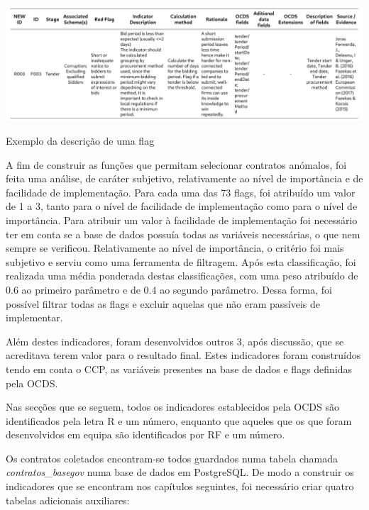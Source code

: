 \begin{table}[H]
	\centering
	\includegraphics[width=\textwidth]{imagens/tabela_flags.png}
	\caption{Exemplo da descrição de uma flag}
	\label{table:flags}
\end{table}


A fim de construir as funções que permitam selecionar contratos anómalos, foi feita uma análise, de caráter subjetivo, relativamente ao nível de importância e de facilidade de implementação. Para cada uma das 73 flags, foi atribuído um valor de 1 a 3, tanto para o nível de facilidade de implementação como para o nível de importância. Para atribuir um valor à facilidade de implementação foi necessário ter em conta se a base de dados possuía todas as variáveis necessárias, o que nem sempre se verificou. Relativamente ao nível de importância, o critério foi mais subjetivo e serviu como uma ferramenta de filtragem. Após esta classificação, foi realizada uma média ponderada destas classificações, com uma peso atribuído de 0.6 ao primeiro parâmetro e de 0.4 ao segundo parâmetro. Dessa forma, foi possível filtrar todas as flags e excluir aquelas que não eram passíveis de implementar. 

Além destes indicadores, foram desenvolvidos outros 3, após discussão, que se acreditava terem valor para o resultado final. Estes indicadores foram construídos tendo em conta o CCP, as variáveis presentes na base de dados e flags definidas pela OCDS. 

Nas secções que se seguem, todos os indicadores establecidos pela OCDS são identificados pela letra R e um número, enquanto que aqueles que os que foram desenvolvidos em equipa são identificados por RF e um número.

Os contratos coletados encontram-se todos guardados numa tabela chamada \textit{contratos\_basegov} numa base de dados em PostgreSQL. De modo a construir os indicadores que se encontram nos capítulos seguintes, foi necessário criar quatro tabelas adicionais auxiliares:

